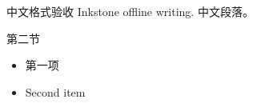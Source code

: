 \documentclass[
  ignorenonframetext,
]{beamer}
\author{\texorpdfstring{}{}}
\date{}
\providecommand{\tightlist}{%
  \setlength{\itemsep}{0pt}\setlength{\parskip}{0pt}}
\begin{document}
\begin{frame}{中文格式验收}
\protect{}\label{ux4e2dux6587ux683cux5f0fux9a8cux6536}
Inkstone offline writing. 中文段落。

\begin{block}{第二节}
\protect{}\label{ux7b2cux4e8cux8282}
\begin{itemize}
\tightlist
\item
  第一项
\item
  Second item
\end{itemize}
\end{block}
\end{frame}
\end{document}
